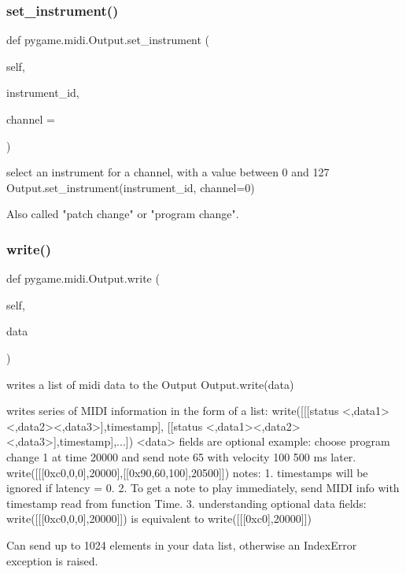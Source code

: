 \subsubsection{\texorpdfstring{set\+\_\+instrument()}{set\_instrument()}}
{\footnotesize\ttfamily def pygame.\+midi.\+Output.\+set\+\_\+instrument (\begin{DoxyParamCaption}\item[{}]{self,  }\item[{}]{instrument\+\_\+id,  }\item[{}]{channel = {} }\end{DoxyParamCaption})}

\begin{DoxyVerb}select an instrument for a channel, with a value between 0 and 127
Output.set_instrument(instrument_id, channel=0)

Also called "patch change" or "program change".
\end{DoxyVerb}
 \mbox{\label{classpygame_1_1midi_1_1_output_a6e673db0f1fd4e834a0c5e47cdc90e86}} 
\subsubsection{\texorpdfstring{write()}{write()}}
{\footnotesize\ttfamily def pygame.\+midi.\+Output.\+write (\begin{DoxyParamCaption}\item[{}]{self,  }\item[{}]{data }\end{DoxyParamCaption})}

\begin{DoxyVerb}writes a list of midi data to the Output
Output.write(data)

writes series of MIDI information in the form of a list:
     write([[[status <,data1><,data2><,data3>],timestamp],
    [[status <,data1><,data2><,data3>],timestamp],...])
<data> fields are optional
example: choose program change 1 at time 20000 and
send note 65 with velocity 100 500 ms later.
     write([[[0xc0,0,0],20000],[[0x90,60,100],20500]])
notes:
  1. timestamps will be ignored if latency = 0.
  2. To get a note to play immediately, send MIDI info with
     timestamp read from function Time.
  3. understanding optional data fields:
       write([[[0xc0,0,0],20000]]) is equivalent to
       write([[[0xc0],20000]])

Can send up to 1024 elements in your data list, otherwise an
 IndexError exception is raised.
\end{DoxyVerb}
 \mbox{\label{classpygame_1_1midi_1_1_output_a55676cf44e2b81ef1b0838cfe9d4acfe}} 
